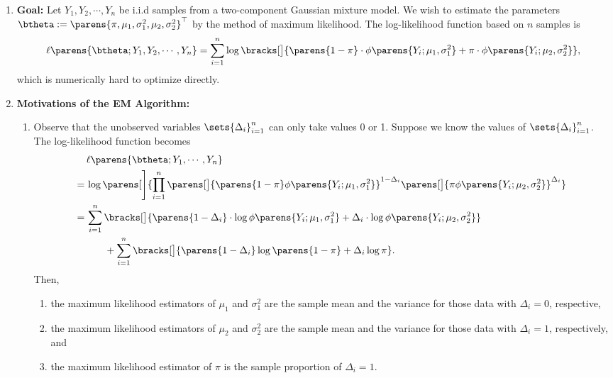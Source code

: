 \documentclass[12pt]{article}
\begin{document}
\begin{enumerate}[label=\textbf{\arabic*.}]
	\item \textbf{Goal:} Let $Y_1, Y_2, \cdots, Y_n$ be i.i.d samples from a two-component Gaussian mixture model. We wish to estimate the parameters $\btheta := \parens{\pi, \mu_1, \sigma_1^2, \mu_2, \sigma_2^2}^\top$ by the method of maximum likelihood. The log-likelihood function based on $n$ samples is 
	\begin{equation}
		\ell \parens{\btheta; Y_1, Y_2, \cdots, Y_n} = \sum_{i=1}^n \log \bracks[\big]{ \parens{1 - \pi} \cdot \phi \parens{Y_i; \mu_1, \sigma_1^2} + \pi \cdot \phi \parens{Y_i; \mu_2, \sigma_2^2}}, 
	\end{equation}
	which is numerically hard to optimize directly. 
	
	\item \textbf{Motivations of the EM Algorithm:} 
	\begin{enumerate}
		\item Observe that the unobserved variables $\sets{\Delta_i}_{i=1}^n$ can only take values 0 or 1. Suppose we know the values of $\sets{\Delta_i}_{i=1}^n$. The log-likelihood function becomes 
		\begin{align*}
			& \, \ell \parens{\btheta; Y_1, \cdots, Y_n} \\ 
			= & \, \log \parens[\Bigg]{\prod_{i=1}^n \parens[\big]{\parens{1 - \pi} \phi \parens{Y_i; \mu_1, \sigma_1^2} }^{1 - \Delta_i} \parens[\big]{\pi \phi \parens{Y_i; \mu_2, \sigma_2^2} }^{\Delta_i}} \\ 
			= & \, \sum_{i=1}^n \bracks[\big]{\parens{1 - \Delta_i} \cdot \log \phi \parens{Y_i; \mu_1, \sigma_1^2} + \Delta_i \cdot \log \phi \parens{Y_i; \mu_2, \sigma_2^2}} \\ 
			& \qquad + \sum_{i=1}^n \bracks[\big]{ \parens{1 - \Delta_i} \log \parens{1 - \pi} + \Delta_i \log \pi}. 
		\end{align*}
		Then, 
		\begin{enumerate}
			\item the maximum likelihood estimators of $\mu_1$ and $\sigma_1^2$ are the sample mean and the variance for those data with $\Delta_i = 0$, respective, 
			\item the maximum likelihood estimators of $\mu_2$ and $\sigma_2^2$ are the sample mean and the variance for those data with $\Delta_i = 1$, respectively, and 
			\item the maximum likelihood estimator of $\pi$ is the sample proportion of $\Delta_i = 1$. 
		\end{enumerate}
		

\end{enumerate}
\end{enumerate}
\end{document}
